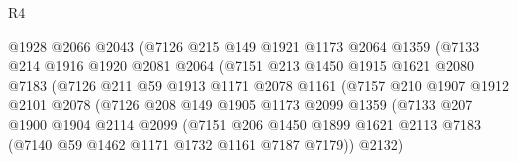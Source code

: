 \begin{lexlean}{R4}
\begin{coremodule}
                              @1928
                              @2066
                              @2043
                              (@7126
                                @215
                                @149
                                @1921
                                @1173
                                @2064
                                @1359
                                (@7133
                                  @214
                                  @1916
                                  @1920
                                  @2081
                                  @2064
                                  (@7151
                                    @213
                                    @1450
                                    @1915
                                    @1621
                                    @2080
                                    @7183
                                    (@7126
                                      @211
                                      @59
                                      @1913
                                      @1171
                                      @2078
                                      @1161
                                      (@7157
                                        @210
                                        @1907
                                        @1912
                                        @2101
                                        @2078
                                        (@7126
                                          @208
                                          @149
                                          @1905
                                          @1173
                                          @2099
                                          @1359
                                          (@7133
                                            @207
                                            @1900
                                            @1904
                                            @2114
                                            @2099
                                            (@7151
                                              @206
                                              @1450
                                              @1899
                                              @1621
                                              @2113
                                              @7183
                                              (@7140 @59 @1462 @1171 @1732 @1161 @7187 @7179))
                                            @2132)

\end{coremodule}
\end{lexlean}
